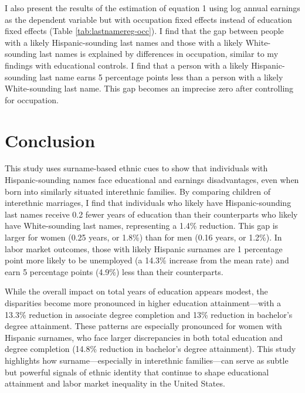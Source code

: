 I also present the results of the estimation of equation 1 using log annual earnings as the dependent variable but with occupation fixed effects instead of education fixed effects (Table \ref{tab:lastnamereg-occ}). I find that the gap between people with a likely Hispanic-sounding last names and those with a likely White-sounding last names is explained by differences in occupation, similar to my findings with educational controls. I find that a person with a likely Hispanic-sounding last name earns 5 percentage points less than a person with a likely White-sounding last name. This gap becomes an imprecise zero after controlling for occupation.

\section{Conclusion}\label{sec:con1}

This study uses surname-based ethnic cues to show that individuals with Hispanic-sounding names face educational and earnings disadvantages, even when born into similarly situated interethnic families. By comparing children of interethnic marriages, I find that individuals who likely have Hispanic-sounding last names receive 0.2 fewer years of education than their counterparts who likely have White-sounding last names, representing a 1.4\% reduction. This gap is larger for women (0.25 years, or 1.8\%) than for men (0.16 years, or 1.2\%). In labor market outcomes, those with likely Hispanic surnames are 1 percentage point more likely to be unemployed (a 14.3\% increase from the mean rate) and earn 5 percentage points (4.9\%) less than their counterparts.

While the overall impact on total years of education appears modest, the disparities become more pronounced in higher education attainment—with a 13.3\% reduction in associate degree completion and 13\% reduction in bachelor's degree attainment. These patterns are especially pronounced for women with Hispanic surnames, who face larger discrepancies in both total education and degree completion (14.8\% reduction in bachelor's degree attainment). This study highlights how surname---especially in interethnic families---can serve as subtle but powerful signals of ethnic identity that continue to shape educational attainment and labor market inequality in the United States.